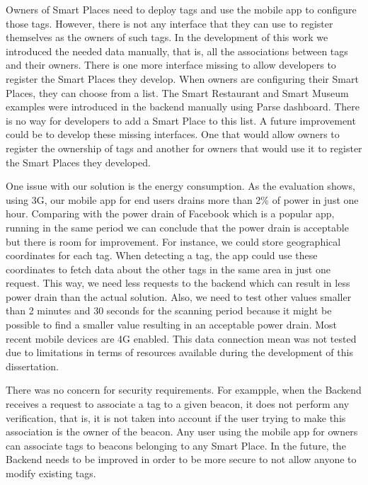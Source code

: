 Owners of Smart Places need to deploy tags and use the mobile app to configure those tags.
However, there is not any interface that they can use to register themselves as the owners of such tags.
In the development of this work we introduced the needed data manually, that is,
all the associations between tags and their owners.
There is one more interface missing to allow developers to register the Smart Places they develop.
When owners are configuring their Smart Places, they can choose from a list.
The Smart Restaurant and Smart Museum examples were introduced in the backend manually using Parse dashboard.
There is no way for developers to add a Smart Place to this list.
A future improvement could be to develop these missing interfaces.
One that would allow owners to register the ownership of tags and another for owners that would use it to register the Smart Places they developed.

One issue with our solution is the energy consumption.
As the evaluation shows, using \gls{3G}, our mobile app for end users drains more than 2\% of power in just one hour.
Comparing with the power drain of Facebook which is a popular app, running in the same period we can conclude that the power drain is acceptable but there is room for improvement.
For instance, we could store geographical coordinates for each tag.
When detecting a tag, the app could use these coordinates to fetch data about the other tags in the same area in just one request.
This way, we need less requests to the backend which can result in less power drain than the actual solution.
Also, we need to test other values smaller than 2 minutes and 30 seconds for the scanning period because it might be possible to find a smaller value resulting in an acceptable power drain.
Most recent mobile devices are \gls{4G} enabled.
This data connection mean was not tested due to limitations in terms of resources available during the development of this dissertation.

There was no concern for security requirements. For exampple, when the Backend receives a request to associate a tag to a given beacon, it does not perform any verification, that is, it is not taken into account if the user trying to make this association is the owner of the beacon.
Any user using the mobile app for owners can associate tags to beacons belonging to any Smart Place.
In the future, the Backend needs to be improved in order to be more secure to not allow anyone to modify existing tags.

